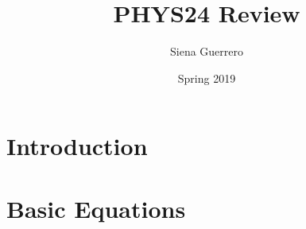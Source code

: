 \documentclass[12pt]{article}
\begin{document}
\title{PHYS24 Review}
\author{Siena Guerrero}
\date{Spring 2019}
\maketitle

\section*{Introduction}

\newpage

\pagestyle{fancy}
\fancyhf{}

\tableofcontents

\newpage

\section{Basic Equations}

\newpage
\end{document}

